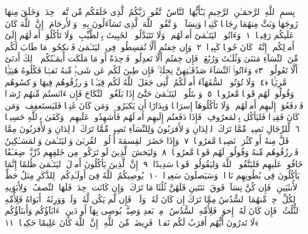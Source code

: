 
  
    
  
    
    

\nopagebreak
  بِسمِ ٱللَّهِ ٱلرَّحمَـٰنِ ٱلرَّحِيمِ
  يَـٰٓأَيُّهَا ٱلنَّاسُ ٱتَّقُوا۟ رَبَّكُمُ ٱلَّذِى خَلَقَكُم مِّن نَّفسٍۢ وَٟحِدَةٍۢ وَخَلَقَ مِنهَا زَوجَهَا وَبَثَّ مِنهُمَا رِجَالًۭا كَثِيرًۭا وَنِسَآءًۭ ۚ وَٱتَّقُوا۟ ٱللَّهَ ٱلَّذِى تَسَآءَلُونَ بِهِۦ وَٱلأَرحَامَ ۚ إِنَّ ٱللَّهَ كَانَ عَلَيكُم رَقِيبًۭا ﴿١﴾
 وَءَاتُوا۟ ٱليَتَـٰمَىٰٓ أَموَٟلَهُم ۖ وَلَا تَتَبَدَّلُوا۟ ٱلخَبِيثَ بِٱلطَّيِّبِ ۖ وَلَا تَأكُلُوٓا۟ أَموَٟلَهُم إِلَىٰٓ أَموَٟلِكُم ۚ إِنَّهُۥ كَانَ حُوبًۭا كَبِيرًۭا ﴿٢﴾
 وَإِن خِفتُم أَلَّا تُقسِطُوا۟ فِى ٱليَتَـٰمَىٰ فَٱنكِحُوا۟ مَا طَابَ لَكُم مِّنَ ٱلنِّسَآءِ مَثنَىٰ وَثُلَـٰثَ وَرُبَٰعَ ۖ فَإِن خِفتُم أَلَّا تَعدِلُوا۟ فَوَٟحِدَةً أَو مَا مَلَكَت أَيمَـٰنُكُم ۚ ذَٟلِكَ أَدنَىٰٓ أَلَّا تَعُولُوا۟ ﴿٣﴾
 وَءَاتُوا۟ ٱلنِّسَآءَ صَدُقَـٰتِهِنَّ نِحلَةًۭ ۚ فَإِن طِبنَ لَكُم عَن شَىءٍۢ مِّنهُ نَفسًۭا فَكُلُوهُ هَنِيٓـًۭٔا مَّرِيٓـًۭٔا ﴿٤﴾
 وَلَا تُؤتُوا۟ ٱلسُّفَهَآءَ أَموَٟلَكُمُ ٱلَّتِى جَعَلَ ٱللَّهُ لَكُم قِيَـٰمًۭا وَٱرزُقُوهُم فِيهَا وَٱكسُوهُم وَقُولُوا۟ لَهُم قَولًۭا مَّعرُوفًۭا ﴿٥﴾
 وَٱبتَلُوا۟ ٱليَتَـٰمَىٰ حَتَّىٰٓ إِذَا بَلَغُوا۟ ٱلنِّكَاحَ فَإِن ءَانَستُم مِّنهُم رُشدًۭا فَٱدفَعُوٓا۟ إِلَيهِم أَموَٟلَهُم ۖ وَلَا تَأكُلُوهَآ إِسرَافًۭا وَبِدَارًا أَن يَكبَرُوا۟ ۚ وَمَن كَانَ غَنِيًّۭا فَليَستَعفِف ۖ وَمَن كَانَ فَقِيرًۭا فَليَأكُل بِٱلمَعرُوفِ ۚ فَإِذَا دَفَعتُم إِلَيهِم أَموَٟلَهُم فَأَشهِدُوا۟ عَلَيهِم ۚ وَكَفَىٰ بِٱللَّهِ حَسِيبًۭا ﴿٦﴾
 لِّلرِّجَالِ نَصِيبٌۭ مِّمَّا تَرَكَ ٱلوَٟلِدَانِ وَٱلأَقرَبُونَ وَلِلنِّسَآءِ نَصِيبٌۭ مِّمَّا تَرَكَ ٱلوَٟلِدَانِ وَٱلأَقرَبُونَ مِمَّا قَلَّ مِنهُ أَو كَثُرَ ۚ نَصِيبًۭا مَّفرُوضًۭا ﴿٧﴾
 وَإِذَا حَضَرَ ٱلقِسمَةَ أُو۟لُوا۟ ٱلقُربَىٰ وَٱليَتَـٰمَىٰ وَٱلمَسَـٰكِينُ فَٱرزُقُوهُم مِّنهُ وَقُولُوا۟ لَهُم قَولًۭا مَّعرُوفًۭا ﴿٨﴾
 وَليَخشَ ٱلَّذِينَ لَو تَرَكُوا۟ مِن خَلفِهِم ذُرِّيَّةًۭ ضِعَـٰفًا خَافُوا۟ عَلَيهِم فَليَتَّقُوا۟ ٱللَّهَ وَليَقُولُوا۟ قَولًۭا سَدِيدًا ﴿٩﴾
 إِنَّ ٱلَّذِينَ يَأكُلُونَ أَموَٟلَ ٱليَتَـٰمَىٰ ظُلمًا إِنَّمَا يَأكُلُونَ فِى بُطُونِهِم نَارًۭا ۖ وَسَيَصلَونَ سَعِيرًۭا ﴿١٠﴾
 يُوصِيكُمُ ٱللَّهُ فِىٓ أَولَـٰدِكُم ۖ لِلذَّكَرِ مِثلُ حَظِّ ٱلأُنثَيَينِ ۚ فَإِن كُنَّ نِسَآءًۭ فَوقَ ٱثنَتَينِ فَلَهُنَّ ثُلُثَا مَا تَرَكَ ۖ وَإِن كَانَت وَٟحِدَةًۭ فَلَهَا ٱلنِّصفُ ۚ وَلِأَبَوَيهِ لِكُلِّ وَٟحِدٍۢ مِّنهُمَا ٱلسُّدُسُ مِمَّا تَرَكَ إِن كَانَ لَهُۥ وَلَدٌۭ ۚ فَإِن لَّم يَكُن لَّهُۥ وَلَدٌۭ وَوَرِثَهُۥٓ أَبَوَاهُ فَلِأُمِّهِ ٱلثُّلُثُ ۚ فَإِن كَانَ لَهُۥٓ إِخوَةٌۭ فَلِأُمِّهِ ٱلسُّدُسُ ۚ مِنۢ بَعدِ وَصِيَّةٍۢ يُوصِى بِهَآ أَو دَينٍ ۗ ءَابَآؤُكُم وَأَبنَآؤُكُم لَا تَدرُونَ أَيُّهُم أَقرَبُ لَكُم نَفعًۭا ۚ فَرِيضَةًۭ مِّنَ ٱللَّهِ ۗ إِنَّ ٱللَّهَ كَانَ عَلِيمًا حَكِيمًۭا ﴿١١﴾
